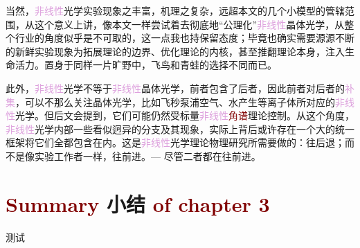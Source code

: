 当然，\textcolor{Plum}{非线性}光学实验现象之丰富，机理之复杂，远超本文的几个小模型的管辖范围，从这个意义上讲，像本文一样尝试着去彻底地“公理化”\textcolor{Plum}{非线性}\textcolor{PineGreen}{晶体光学}，从整个行业的角度似乎是不可取的，这一点我也持保留态度；毕竟也确实需要源源不断的新鲜实验现象为拓展理论的边界、优化理论的内核，甚至推翻理论本身，注入生命活力。置身于同样一片旷野中，飞鸟和青蛙的选择不同而已。

此外，\textcolor{Plum}{非线性}光学不等于\textcolor{Plum}{非线性}\textcolor{PineGreen}{晶体光学}，前者包含了后者，因此前者对后者的\textcolor{Plum}{补集}，可以不那么关注\textcolor{PineGreen}{晶体光学}，比如飞秒泵浦空气、水产生等离子体所对应的\textcolor{Plum}{非线性}光学。但后文会提到，它们可能仍然受标量\textcolor{Plum}{非线性}\textcolor{Maroon}{角谱}理论控制。从这个角度，\textcolor{Plum}{非线性}光学内部一些看似迥异的分支及其现象，实际上背后或许存在一个大的统一框架将它们全都包含在内。这是\textcolor{Plum}{非线性}光学\textcolor{NavyBlue}{理论物理}研究所需要做的：往后退；而不是像实验工作者一样，往前进。--- 尽管二者都在往前进。

\clearpage

\section{\textcolor{Maroon}{Summary} 小结 \textcolor{Maroon}{of chapter 3}}\label{sec:summary-chapter3}

测试
